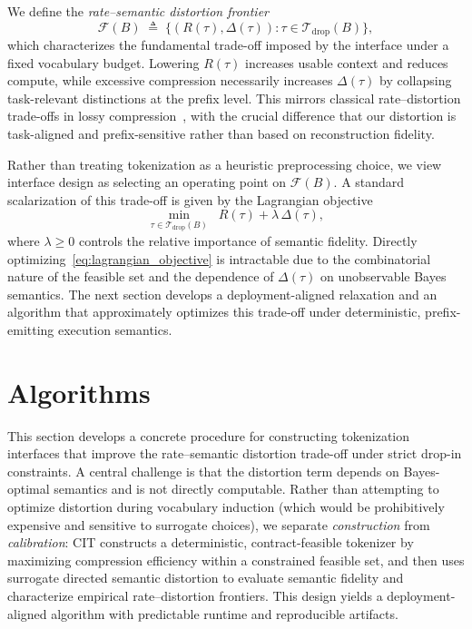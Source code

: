 We define the \emph{rate--semantic distortion frontier}
\begin{equation}
\mathcal{F}(B)
\;\triangleq\;
\big\{
(R(\tau), \Delta(\tau)) :
\tau \in \mathcal{T}_{\mathrm{drop}}(B)
\big\},
\label{eq:frontier}
\end{equation}
which characterizes the fundamental trade-off imposed by the interface under a fixed vocabulary budget.
Lowering $R(\tau)$ increases usable context and reduces compute, while excessive compression necessarily
increases $\Delta(\tau)$ by collapsing task-relevant distinctions at the prefix level.
This mirrors classical rate--distortion trade-offs in lossy compression~\cite{shannon1948mathematical,cover1999elements,blahut2003computation,arimoto1972algorithm},
with the crucial difference that our distortion is task-aligned and prefix-sensitive rather than based on
reconstruction fidelity.

Rather than treating tokenization as a heuristic preprocessing choice, we view interface design as selecting an
operating point on $\mathcal{F}(B)$.
A standard scalarization of this trade-off is given by the Lagrangian objective
\begin{equation}
\min_{\tau \in \mathcal{T}_{\mathrm{drop}}(B)}
\;\;
R(\tau) + \lambda\,\Delta(\tau),
\label{eq:lagrangian_objective}
\end{equation}
where $\lambda \ge 0$ controls the relative importance of semantic fidelity.
Directly optimizing~\eqref{eq:lagrangian_objective} is intractable due to the combinatorial nature of the
feasible set and the dependence of $\Delta(\tau)$ on unobservable Bayes semantics.
The next section develops a deployment-aligned relaxation and an algorithm that approximately optimizes this
trade-off under deterministic, prefix-emitting execution semantics.

\section{Algorithms}
\label{sec:algorithms}

This section develops a concrete procedure for constructing tokenization interfaces that improve the rate--semantic distortion trade-off under strict drop-in constraints.
A central challenge is that the distortion term depends on Bayes-optimal semantics and is not directly computable.
Rather than attempting to optimize distortion during vocabulary induction (which would be prohibitively expensive and sensitive to surrogate choices), we separate \emph{construction} from \emph{calibration}:
CIT constructs a deterministic, contract-feasible tokenizer by maximizing compression efficiency within a constrained feasible set, and then uses surrogate directed semantic distortion to evaluate semantic fidelity and characterize empirical rate--distortion frontiers.
This design yields a deployment-aligned algorithm with predictable runtime and reproducible artifacts.


